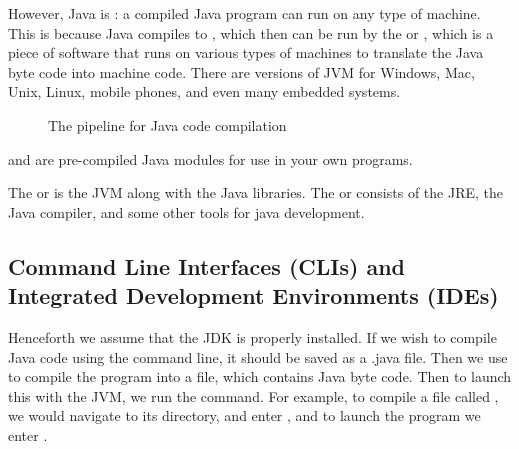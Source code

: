 \documentclass[11pt]{article}
\begin{document}
However, Java is : a compiled Java program can run on any type of machine. This is because Java compiles to , which then can be run by the  or , which is a piece of software that runs on various types of machines to translate the Java byte code into machine code. There are versions of JVM for Windows, Mac, Unix, Linux, mobile phones, and even many embedded systems.
\begin{figure}[H]
    \centering
    \caption{The pipeline for Java code compilation}
    \label{fig:javaCompilePipeline}
    \vspace{10pt}
\end{figure}
\begin{defi}
     and  are pre-compiled Java modules for use in your own programs.
\end{defi}
The  or  is the JVM along with the Java libraries. The  or  consists of the JRE, the Java compiler, and some other tools for java development.
\pagebreak
\subsection{Command Line Interfaces (CLIs) and Integrated Development Environments (IDEs)}
Henceforth we assume that the JDK is properly installed. If we wish to compile Java code using the command line, it should be saved as a .java file. Then we use  to compile the program into a  file, which contains Java byte code. Then to launch this with the JVM, we run the  command. For example, to compile a file called , we would navigate to its directory, and enter , and to launch the program we enter . 
\end{document}
